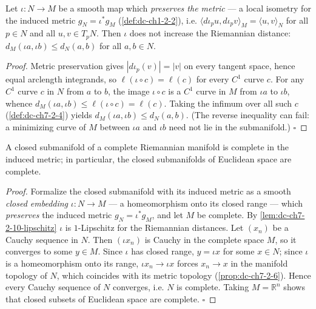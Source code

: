 \begin{lemma}
  \label{lem:dc-ch7-2-10-lipschitz}
  \leanok
  Let $\iota:N\to M$ be a smooth map which \emph{preserves the metric} — a local isometry
  for the induced metric $g_N=\iota^*g_M$ (\cref{def:dc-ch1-2-2}), i.e.
  $\langle d\iota_p u,d\iota_p v\rangle_M=\langle u,v\rangle_N$ for all $p\in N$ and all
  $u,v\in T_pN$. Then $\iota$ does not increase the Riemannian distance:
  $d_M(\iota a,\iota b)\le d_N(a,b)$ for all $a,b\in N$.
\end{lemma}
\begin{proof}
  \leanok
  Metric preservation gives $|d\iota_p(v)|=|v|$ on every tangent space, hence equal
  arclength integrands, so $\ell(\iota\circ c)=\ell(c)$ for every $C^1$ curve $c$. For any
  $C^1$ curve $c$ in $N$ from $a$ to $b$, the image $\iota\circ c$ is a $C^1$ curve in $M$
  from $\iota a$ to $\iota b$, whence $d_M(\iota a,\iota b)\le\ell(\iota\circ c)=\ell(c)$.
  Taking the infimum over all such $c$ (\cref{def:dc-ch7-2-4}) yields
  $d_M(\iota a,\iota b)\le d_N(a,b)$. (The reverse inequality can fail: a minimizing
  curve of $M$ between $\iota a$ and $\iota b$ need not lie in the submanifold.) $\square$
\end{proof}

\begin{corollary}
  \label{cor:dc-ch7-2-10}
  \leanok
  A closed submanifold of a complete Riemannian manifold is complete in the induced
  metric; in particular, the closed submanifolds of Euclidean space are complete.
\end{corollary}
\begin{proof}
  \leanok
  Formalize the closed submanifold with its induced metric as a smooth \emph{closed
  embedding} $\iota:N\to M$ — a homeomorphism onto its closed range — which \emph{preserves}
  the induced metric $g_N=\iota^*g_M$, and let $M$ be complete. By
  \cref{lem:dc-ch7-2-10-lipschitz} $\iota$ is $1$-Lipschitz for the Riemannian distances.
  Let $(x_n)$ be a Cauchy sequence in $N$. Then $(\iota x_n)$ is Cauchy in the complete
  space $M$, so it converges to some $y\in M$. Since $\iota$ has closed range, $y=\iota x$
  for some $x\in N$; since $\iota$ is a homeomorphism onto its range, $\iota x_n\to\iota x$
  forces $x_n\to x$ in the manifold topology of $N$, which coincides with its metric
  topology (\cref{prop:dc-ch7-2-6}). Hence every Cauchy sequence of $N$ converges, i.e.
  $N$ is complete. Taking $M=\mathbb R^n$ shows that closed subsets of Euclidean space are
  complete. $\square$
\end{proof}

